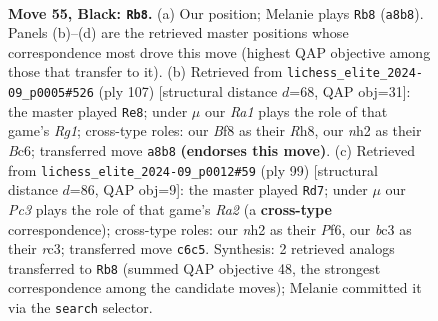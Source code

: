 \documentclass[11pt]{article}
\begin{document}
\begin{figure}[p]\centering
\begin{subfigure}{0.46\textwidth}\centering
\resizebox{\linewidth}{!}{%
\newchessgame
\chessboard[
  setfen={r2k1b2/6p1/p1p4r/Pp1b1p1p/2p2P1P/2B1P1P1/1P5N/1RK3R1 b - - 12 55},
  showmover=false,
  pgfstyle=straightmove, color=movearrow, markmove={a8-b8}
]}
\caption{}
\end{subfigure}\hfill
\begin{subfigure}{0.46\textwidth}\centering
\resizebox{\linewidth}{!}{%
\newchessgame
\chessboard[
  setfen={6rr/5p2/1kb1p1p1/1p1pP2p/pP3P2/P1P1R1P1/4B2P/2KR4 b - - 48 54},
  showmover=false,
  pgfstyle=straightmove, color=movearrow, markmove={g8-e8}
]}
\caption{}
\end{subfigure}
\\[4pt]
\begin{subfigure}{0.46\textwidth}\centering
\resizebox{\linewidth}{!}{%
\newchessgame
\chessboard[
  setfen={8/r5pk/1bp2p2/pr2pPp1/4P1K1/1PRP3P/R3N1P1/8 b - - 5 50},
  showmover=false,
  pgfstyle=straightmove, color=movearrow, markmove={a7-d7}
]}
\caption{}
\end{subfigure}\hfill

\caption{\textbf{Move 55, Black: \texttt{Rb8}.} (a) Our position; Melanie plays \texttt{Rb8} (\texttt{a8b8}). Panels (b)--(d) are the retrieved master positions whose correspondence most drove this move (highest QAP objective among those that transfer to it). (b) Retrieved from \texttt{lichess\_elite\_2024-09\_p0005\#526} (ply 107) [structural distance $d$=68, QAP obj=31]: the master played \texttt{Re8}; under $\mu$ our \emph{Ra1} plays the role of that game's \emph{Rg1}; cross-type roles: our \emph{B}f8 as their \emph{R}h8, our \emph{n}h2 as their \emph{B}c6; transferred move \texttt{a8b8} \textbf{(endorses this move)}. (c) Retrieved from \texttt{lichess\_elite\_2024-09\_p0012\#59} (ply 99) [structural distance $d$=86, QAP obj=9]: the master played \texttt{Rd7}; under $\mu$ our \emph{Pc3} plays the role of that game's \emph{Ra2} (a \textbf{cross-type} correspondence); cross-type roles: our \emph{n}h2 as their \emph{P}f6, our \emph{b}c3 as their \emph{r}c3; transferred move \texttt{c6c5}. Synthesis: 2 retrieved analogs transferred to \texttt{Rb8} (summed QAP objective 48, the strongest correspondence among the candidate moves); Melanie committed it via the \texttt{search} selector.}
\label{fig:thought-m109}
\end{figure}

\clearpage
\end{document}

